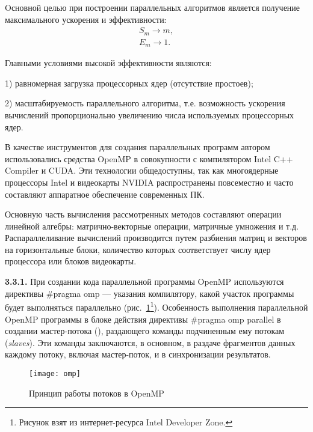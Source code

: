 Oсновной целью при построении параллельных алгоритмов является получение максимального ускорения и эффективности:
\begin{equation}\nonumber
\begin{aligned}
S_m \rightarrow m, \\[16pt]
E_m \rightarrow 1.
\end{aligned}
\end{equation}

Главными условиями высокой эффективности являются:

1) равномерная загрузка процессорных ядер (отсутствие простоев);

2) масштабируемость параллельного алгоритма, т.е. возможность ускорения вычислений
пропорционально увеличению числа используемых процессорных ядер.

В качестве инструментов для создания параллельных программ автором использовались средства OpenMP в совокупности с компилятором Intel C++ Compiler и CUDA. Эти технологии общедоступны, так как многоядерные процессоры Intel и видеокарты NVIDIA распространены повсеместно и часто составляют аппаратное обеспечение современных ПК. 

Основную часть вычисления рассмотренных методов составляют операции линейной алгебры: матрично-векторные операции, матричные умножения и т.д. Распараллеливание вычислений производится путем разбиения матриц и векторов на горизонтальные блоки, количество которых соответствует числу ядер процессора или блоков видеокарты.

{\bfseries 3.3.1.} При создании кода параллельной программы OpenMP используются директивы \#pragma omp --- указания компилятору, какой участок программы будет выполняться параллельно (рис.~\ref{fig:omp}\footnote{Рисунок взят из интернет-ресурса Intel Developer Zone.}). Особенность выполнения параллельной OpenMP программы в блоке действия директивы \#pragma omp parallel в создании мастер-потока (), раздающего команды подчиненным ему потокам (\textit{slaves}). Эти команды заключаются, в основном, в раздаче фрагментов данных каждому потоку, включая мастер-поток, и в синхронизации результатов. 
\begin{figure}
	\centering
	\texttt{[image: omp]}
	\caption{Принцип работы потоков в OpenMP}
	\label{fig:omp}
\end{figure}

